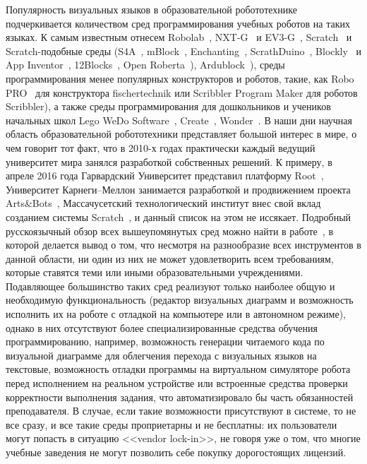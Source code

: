 \documentclass[a5paper]{article}
\begin{document}
Популярность визуальных языков в образовательной робототехнике подчеркивается количеством сред программирования учебных роботов на таких языках. К самым известным отнесем Robolab~\cite{erwin2000lego}, NXT-G~\cite{kelly2010lego} и EV3-G~\cite{valk2014lego}, Scratch~\cite{resnick2009scratch} и Scratch-подобные среды (S4A~\cite{s4a}, mBlock~\cite{mblock}, Enchanting~\cite{enchanting}, ScrathDuino~\cite{scratchduino}, Blockly~\cite{blockly} и App Inventor~\cite{wolber2011app}, 12Blocks~\cite{12blocks}, Open Roberta~\cite{jost2014graphical}), Ardublock~\cite{ardublock}), среды программирования менее популярных конструкторов и роботов, такие, как Robo PRO~\cite{chang2006incorporating} для конструктора fischertechnik или Scribbler Program Maker для роботов Scribbler), а также среды программирования для дошкольников и учеников начальных школ Lego WeDo Software~\cite{mayerova2012pilot}, Create~\cite{cross2013visual}, Wonder~\cite{wonder}. В наши дни научная область образовательной робототехники представляет большой интерес в мире, о чем говорит тот факт, что в 2010-х годах практически каждый ведущий университет мира занялся разработкой собственных решений. К примеру, в апреле 2016 года Гарвардский Университет представил платформу Root~\cite{root}, Университет Карнеги--Меллон занимается разработкой и продвижением проекта Arts\&Bots~\cite{cross2013visual}, Массачусетский технологический институт внес свой вклад созданием системы Scratch~\cite{resnick2009scratch}, и данный список на этом не иссякает. Подробный русскоязычный обзор всех вышеупомянутых сред можно найти в работе~\cite{mordvinov2016NONPUBLISHED}, в которой делается вывод о том, что несмотря на разнообразие всех инструментов в данной области, ни один из них не может удовлетворить всем требованиям, которые ставятся теми или иными образовательными учреждениями. Подавляющее большинство таких сред реализуют только наиболее общую и необходимую функциональность (редактор визуальных диаграмм и возможность исполнить их на роботе с отладкой на компьютере или в автономном режиме), однако в них отсутствуют более специализированные средства обучения программированию, например, возможность генерации читаемого кода по визуальной диаграмме для облегчения перехода с визуальных языков на текстовые, возможность отладки программы на виртуальном симуляторе робота перед исполнением на реальном устройстве или встроенные средства проверки корректности выполнения задания, что автоматизировало бы часть обязанностей преподавателя. В случае, если такие возможности присутствуют в системе, то не все сразу, и все такие среды проприетарны и не бесплатны: их пользователи могут попасть в ситуацию <<vendor lock-in>>, не говоря уже о том, что многие учебные заведения не могут позволить себе покупку дорогостоящих лицензий. 
\end{document}
